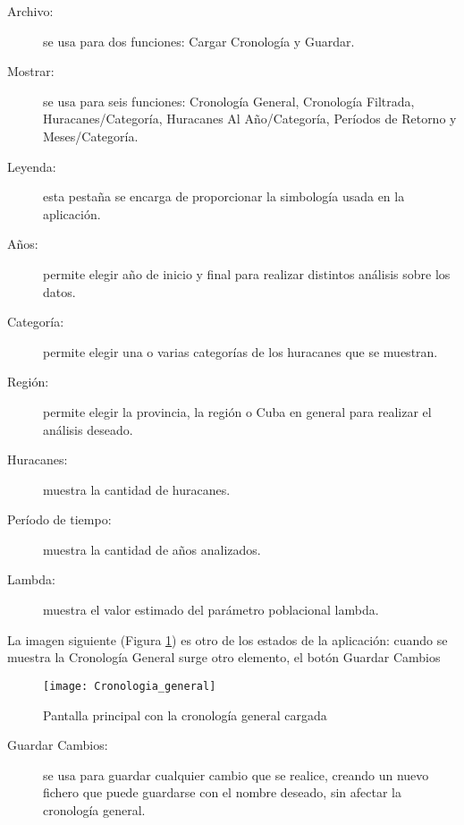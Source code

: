 \begin{description}
\item[Archivo: ]{se usa para dos funciones: Cargar Cronología y Guardar.}

\item [Mostrar:] {se usa para seis funciones: Cronología General, Cronología Filtrada, Huracanes/Categoría, Huracanes Al Año/Categoría, Períodos de Retorno y Meses/Categoría.}

\item[Leyenda:] { esta pestaña se encarga de proporcionar la simbología usada en la aplicación.}

\item[Años:] permite elegir año de inicio y final para realizar distintos análisis sobre los datos.

\item[Categoría:]{ permite elegir una o varias categorías de los huracanes que se muestran.}

\item[Región:]{ permite elegir la provincia, la región o Cuba en general para realizar el análisis deseado.}

\item[Huracanes:]{ muestra la cantidad de huracanes.}

\item[Período de tiempo:]{ muestra la cantidad de años analizados.}

\item[Lambda:]{ muestra el valor estimado del parámetro poblacional lambda.}
\end{description}

\pagebreak

La imagen siguiente (Figura \ref{fig:Cronologia_general}) es otro de los estados de la aplicación: cuando se muestra la Cronología General surge otro elemento, el botón Guardar Cambios

\begin{figure}[H]
\centering
\texttt{[image: Cronologia\_general]}
\caption{Pantalla principal con la cronología general cargada}
\label{fig:Cronologia_general}
\end{figure}


\begin{description}
\item[Guardar Cambios:]{ se usa para guardar cualquier cambio que se realice, creando un nuevo ﬁchero que puede guardarse con el nombre deseado, sin afectar la cronología general.}
\end{description}

